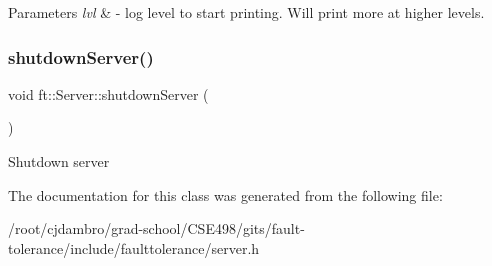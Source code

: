 \begin{DoxyParams}{Parameters}
{\em lvl} & -\/ log level to start printing. Will print more at higher levels. \\
\hline
\end{DoxyParams}
\mbox{\label{classft_1_1Server_a4df01ccbcc6295e4930e3c65dedaa595}} 
\subsubsection{\texorpdfstring{shutdown\+Server()}{shutdownServer()}}
{\footnotesize\ttfamily void ft\+::\+Server\+::shutdown\+Server (\begin{DoxyParamCaption}{ }\end{DoxyParamCaption})}

Shutdown server 

The documentation for this class was generated from the following file\+:\begin{DoxyCompactItemize}
\item 
/root/cjdambro/grad-\/school/\+C\+S\+E498/gits/fault-\/tolerance/include/faulttolerance/server.\+h\end{DoxyCompactItemize}
